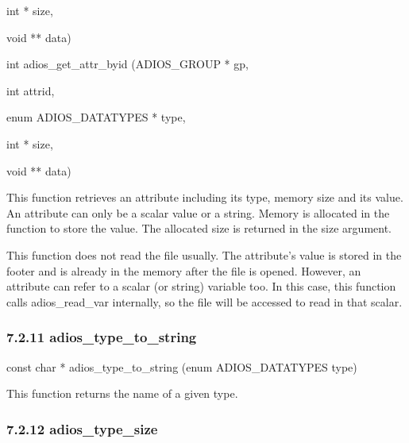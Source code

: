 \vspace{10pt}
\parindent=144pt
int                   * size,

\vspace{10pt}
\parindent=72pt
void                 ** data)

\vspace{22pt}
\parindent=0pt
int adios\_get\_attr\_byid (ADIOS\_GROUP           * gp,

\vspace{10pt}
\parindent=90pt
int                     attrid,

\vspace{10pt}
enum ADIOS\_DATATYPES  * type,

\vspace{10pt}
\parindent=180pt
int                   * size,

\vspace{10pt}
\parindent=90pt
void                 ** data)

\vspace{22pt}
\parindent=0pt
This function retrieves an attribute including its type, memory size and its value. 
An attribute can only be a scalar value or a string. Memory is allocated in the 
function to store the value. The allocated size is returned in the size argument. 

\vspace{10pt}
This function does not read the file usually. The attribute's value is stored in 
the footer and is already in the memory after the file is opened. However, an attribute 
can refer to a scalar (or string) variable too. In this case, this function calls 
adios\_read\_var internally, so the file will be accessed to read in that scalar. 
\label{HToc182553409}

\vspace{10pt}
\subsubsection*{{\large \textbf{7.2.11 adios\_type\_to\_string}}}

\vspace{10pt}
const char * adios\_type\_to\_string (enum ADIOS\_DATATYPES type)

\vspace{22pt}
This function returns the name of a given type.\label{HToc182553410}

\vspace{10pt}
\subsubsection*{{\large \textbf{7.2.12 adios\_type\_size}}}

